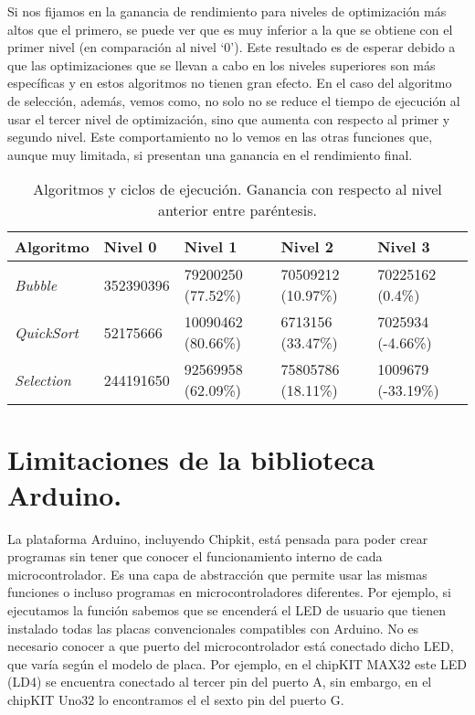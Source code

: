 Si nos fijamos en la ganancia de rendimiento para niveles de optimización más altos que el primero, se puede ver que es muy inferior a la que se obtiene con el primer nivel (en comparación al nivel `0'). Este resultado es de esperar debido a que las optimizaciones que se llevan a cabo en los niveles superiores son más específicas y en estos algoritmos no tienen gran efecto. En el caso del algoritmo de selección, además, vemos como, no solo no se reduce el tiempo de ejecución al usar el tercer nivel de optimización, sino que aumenta con respecto al primer y segundo nivel. Este comportamiento no lo vemos en las otras funciones que, aunque muy limitada, si presentan una ganancia en el rendimiento final.
\begin{table}[htb]
	\begin{center}
		\begin{tabular}{lllll}
      \textbf{Algoritmo} & \textbf{Nivel 0} & \textbf{Nivel 1} & \textbf{Nivel 2} & \textbf{Nivel 3} \\
      \hline
      \textit{Bubble		}&	352390396	&	79200250 (77.52\%)	&	70509212 (10.97\%)	&	70225162 (0.4\%) \\
			\textit{QuickSort	}	&	52175666	&	10090462	(80.66\%)	&	6713156 (33.47\%)	&	7025934 (-4.66\%) \\
			\textit{Selection	} &	244191650	&	92569958 (62.09\%)	&	75805786 (18.11\%)	&	1009679 (-33.19\%) \\
		\end{tabular}
	\end{center}
\caption{Algoritmos y ciclos de ejecución. Ganancia con respecto al nivel anterior entre paréntesis.}
\label{tabla:ciclos}
\end{table}
\section{Limitaciones de la biblioteca Arduino.} %
\label{sec:Limitaciones de la biblioteca Arduino.}

La plataforma Arduino, incluyendo Chipkit, está pensada para poder crear programas sin tener que conocer el funcionamiento interno de cada microcontrolador. Es una capa de abstracción  que permite usar las mismas funciones o incluso programas en microcontroladores diferentes. Por ejemplo, si ejecutamos la función  sabemos que se encenderá el LED de usuario que tienen instalado todas las placas convencionales compatibles con Arduino. No es necesario conocer a que puerto del microcontrolador está conectado dicho LED, que varía según el modelo de placa. Por ejemplo, en el chipKIT MAX32 este LED (LD4) se encuentra conectado al tercer pin del puerto A, sin embargo, en el chipKIT Uno32 lo encontramos el el sexto pin del puerto G.\@

